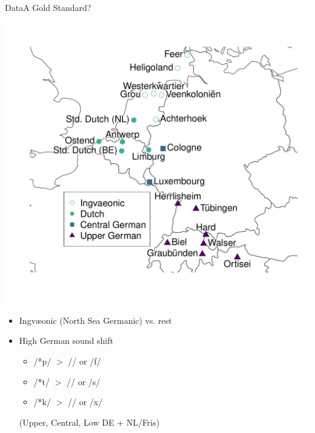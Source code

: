 \documentclass[xcolor={dvipsnames}]{beamer}
\begin{document}
\begin{frame}{Data}{A Gold Standard?}
\vspace{-1.1em}
\begin{minipage}{.6\textwidth}
\includegraphics[width=\textwidth,trim={4cm 0 5cm 0},clip]{figures/map-pres.pdf}
\end{minipage}%
\begin{minipage}{.41\textwidth}
\begin{itemize}
    \item Ingv\ae{}onic (North Sea Germanic) vs. rest
    \pause
    \item High German sound shift\\
    \begin{itemize}
        \item /*p/ $>$ // or /f/
        \item /*t/ $>$ // or /s/
        \item /*k/ $>$ // or /x/
    \end{itemize}
    (Upper, Central, Low DE + NL/Fris)
\end{itemize}
\end{minipage}
\end{frame}
\end{document}
